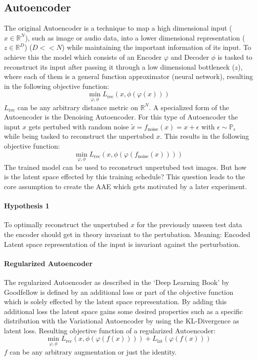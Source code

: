 \documentclass[10pt,a4paper]{article}
\begin{document}
\subsection{Autoencoder}\label{Autoencoder}
The original Autoencoder is a technique to map a high dimensional input ($x \in \mathbb{R}^N$), such as image or audio data, into a lower dimensional representation ($z \in \mathbb{R}^D$) ($D << N$) while maintaining the important information of its input. To achieve this the model which consists of an Encoder $\varphi$ and Decoder $\phi$ is tasked to reconstruct its input after passing it through a low dimensional bottleneck ($z$), where each of them is a general function approximator (neural network), resulting in the following objective function:
\begin{equation}
\min_{\varphi, \phi} L_{\text{rec}}(x, \phi(\varphi(x)))
\end{equation}
$L_{\text{rec}}$ can be any arbitrary distance metric on $\mathbb{R}^N$. 
A specialized form of the Autoencoder is the  Denoising Autoencoder. For this type of Autoencoder the input $x$ gets pertubed with random noise $\tilde{x} = f_{\text{noise}}(x) =x + \epsilon$ with $\epsilon \sim \mathbb{P}_{\epsilon}$ while being tasked to reconstruct the unpertubed $x$. This results in the following objective function:
\begin{equation}
\min_{\varphi, \phi} L_{\text{rec}}(x, \phi(\varphi(f_{\text{noise}}(x) )))
\end{equation}
The trained model can be used to reconstruct unpertubed test images. But how is the latent space effected by this training schedule?
This question leads to the core assumption to create the AAE which gets motivated by a later experiment.
\paragraph{Hypothesis 1} To optimally reconstruct the unpertubed $x$ for the previously unseen test data the encoder should get in theory invariant to the pertubation. Meaning: Encoded Latent space representation of the input is invariant against the perturbation.\\
\paragraph{Regularized Autoencoder}
The regularized Autoencoder as described in the `Deep Learning Book' by Goodfellow  \cite{Goodfellow} is defined by an additional loss or part of the objective function which is solely effected by the latent space representation. By adding this additional loss the latent space gains some desired properties such as a specific distribution with the Variational Autoencoder by using the KL-Divergence as latent loss.
Resulting objective function of a regularized Autoencoder:
\begin{equation}
\min_{\varphi, \phi} L_{\text{rec}}(x, \phi(\varphi(f(x) ))) + L_{\text{lat}}(\varphi(f(x)))
\end{equation}
$f$ can be any arbitrary augmentation or just the identity.
\end{document}
